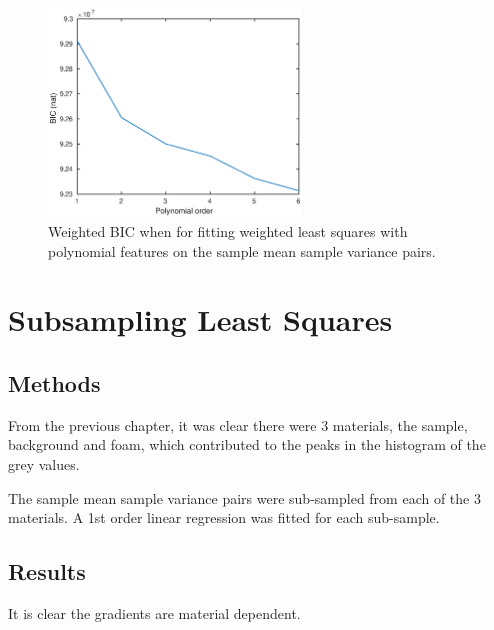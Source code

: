 \documentclass[12pt]{report}
\begin{document}
\begin{figure}
	\centering
	\includegraphics[width=0.6\textwidth]{figures/meanVar/polynomialBIC.eps}
	\caption{Weighted BIC when for fitting weighted least squares with polynomial features on the sample mean sample variance pairs.}
	\label{fig:weightedLS_BIC}
\end{figure}

\section{Subsampling Least Squares}
\subsection{Methods}
From the previous chapter, it was clear there were 3 materials, the sample, background and foam, which contributed to the peaks in the histogram of the grey values.

The sample mean sample variance pairs were sub-sampled from each of the 3 materials. A 1st order linear regression was fitted for each sub-sample.

\subsection{Results}

It is clear the gradients are material dependent.
\end{document}
